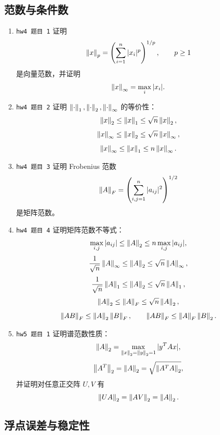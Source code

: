 \documentclass{article}
\begin{document}
\subsection{范数与条件数}

\begin{enumerate}
  \item \texttt{hw4 题目 1} 证明
  \[
    \left\| x \right\|_p=\left(\sum_{i=1}^n |x_i|^p\right)^{1/p},\qquad p\ge1
  \]
  是向量范数，并证明
  \[
    \left\| x \right\|_\infty=\max_i |x_i|.
  \]

  \item \texttt{hw4 题目 2} 证明 $\left\| \cdot \right\|_1,\left\| \cdot \right\|_2,\left\| \cdot \right\|_\infty$ 的等价性：
  \[
    \left\| x \right\|_2\le\left\| x \right\|_1\le\sqrt n\left\| x \right\|_2,
  \]
  \[
    \left\| x \right\|_\infty\le\left\| x \right\|_2\le\sqrt n\left\| x \right\|_\infty,
  \]
  \[
    \left\| x \right\|_\infty\le\left\| x \right\|_1\le n\left\| x \right\|_\infty.
  \]

  \item \texttt{hw4 题目 3} 证明 Frobenius 范数
  \[
    \left\| A \right\|_F=\left(\sum_{i,j=1}^n |a_{ij}|^2\right)^{1/2}
  \]
  是矩阵范数。

  \item \texttt{hw4 题目 4} 证明矩阵范数不等式：
  \[
    \max_{i,j}|a_{ij}|\le\left\| A \right\|_2\le n\max_{i,j}|a_{ij}|,
  \]
  \[
    \frac1{\sqrt n}\left\| A \right\|_\infty\le\left\| A \right\|_2\le\sqrt n\left\| A \right\|_\infty,
  \]
  \[
    \frac1{\sqrt n}\left\| A \right\|_1\le\left\| A \right\|_2\le\sqrt n\left\| A \right\|_1,
  \]
  \[
    \left\| A \right\|_2\le\left\| A \right\|_F\le\sqrt n\left\| A \right\|_2,
  \]
  \[
    \left\| AB \right\|_F\le\left\| A \right\|_2\left\| B \right\|_F,\qquad
    \left\| AB \right\|_F\le\left\| A \right\|_F\left\| B \right\|_2.
  \]

  \item \texttt{hw5 题目 1} 证明谱范数性质：
  \[
    \left\| A \right\|_2=\max_{\left\| x \right\|_2=\left\| y \right\|_2=1}|y^TAx|,
  \]
  \[
    \left\| A^T \right\|_2=\left\| A \right\|_2=\sqrt{\left\| A^TA \right\|_2},
  \]
  并证明对任意正交阵 $U,V$ 有
  \[
    \left\| UA \right\|_2=\left\| AV \right\|_2=\left\| A \right\|_2.
  \]
\end{enumerate}

\subsection{浮点误差与稳定性}
\end{document}
